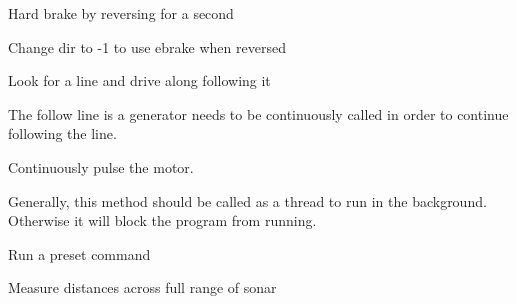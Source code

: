 \documentclass[letterpaper,10pt,english]{sphinxmanual}
\begin{document}
\begin{fulllineitems}
\begin{fulllineitems}
\label{\detokenize{index:picar.PiCar.ebrake}}
Hard brake by reversing for a second

Change dir to -1 to use ebrake when reversed

\end{fulllineitems}


\begin{fulllineitems}
\label{\detokenize{index:picar.PiCar.follow_line}}
Look for a line and drive along following it

The follow line is a generator needs to be continuously called in order to continue following the line.

\end{fulllineitems}


\begin{fulllineitems}
\label{\detokenize{index:picar.PiCar.pulse}}
Continuously pulse the motor.

Generally, this method should be called as a thread to run in the background. Otherwise it will block the program from running.

\end{fulllineitems}


\begin{fulllineitems}
\label{\detokenize{index:picar.PiCar.run_cmd}}
Run a preset command

\end{fulllineitems}


\begin{fulllineitems}
\label{\detokenize{index:picar.PiCar.sonar_scan}}
Measure distances across full range of sonar


\end{fulllineitems}
\end{fulllineitems}
\end{document}
